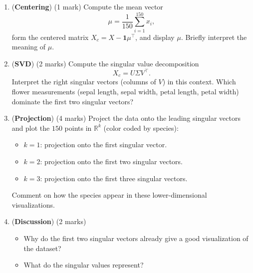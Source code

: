 \documentclass[11pt]{article}
\begin{document}
\begin{enumerate}
    \item (\textbf{Centering})  
    (1 mark) Compute the mean vector
    \[
    \mu = \frac{1}{150}\sum_{i=1}^{150} x_i,
    \]
    form the centered matrix $X_c = X - \mathbf{1}\mu^\top$, and display $\mu$.  
    Briefly interpret the meaning of $\mu$.

    \item (\textbf{SVD})  
    (2 marks) Compute the singular value decomposition
    \[
    X_c = U \Sigma V^\top.
    \]
    Interpret the right singular vectors (columns of $V$) in this context.  
    Which flower measurements (sepal length, sepal width, petal length, petal width) dominate the first two singular vectors?

    \item (\textbf{Projection}) (4 marks)  
    Project the data onto the leading singular vectors and plot the $150$ points in $\mathbb{R}^k$ (color coded by species):
    \begin{itemize}
        \item \(k=1\): projection onto the first singular vector.
        \item \(k=2\): projection onto the first two singular vectors.
        \item \(k=3\): projection onto the first three singular vectors.
    \end{itemize}
    Comment on how the species appear in these lower-dimensional visualizations.

    \item (\textbf{Discussion}) (2 marks)
    \begin{itemize}
        \item Why do the first two singular vectors already give a good visualization of the dataset?  
        \item What do the singular values represent?
    \end{itemize}
\end{enumerate}
\end{document}
